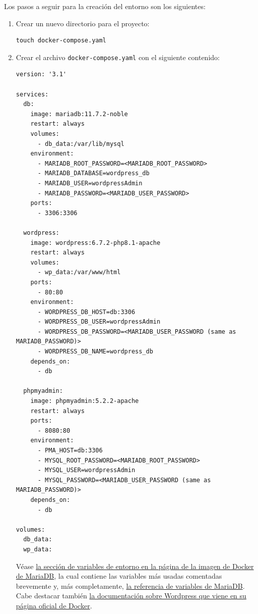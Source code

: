 \documentclass[a4paper]{article}
\begin{document}
\vspace{1em}

Los pasos a seguir para la creación del entorno son los siguientes:

\begin{enumerate}
    \item Crear un nuevo directorio para el proyecto:
    \begin{lstlisting}
touch docker-compose.yaml
    \end{lstlisting}

    \newpage

    \item Crear el archivo \texttt{docker-compose.yaml} con el siguiente contenido:
    \begin{lstlisting}
version: '3.1'

services:
  db:
    image: mariadb:11.7.2-noble
    restart: always
    volumes:
      - db_data:/var/lib/mysql
    environment:
      - MARIADB_ROOT_PASSWORD=<MARIADB_ROOT_PASSWORD>
      - MARIADB_DATABASE=wordpress_db
      - MARIADB_USER=wordpressAdmin
      - MARIADB_PASSWORD=<MARIADB_USER_PASSWORD>
    ports:
      - 3306:3306

  wordpress:
    image: wordpress:6.7.2-php8.1-apache
    restart: always
    volumes:
      - wp_data:/var/www/html
    ports:
      - 80:80
    environment:
      - WORDPRESS_DB_HOST=db:3306
      - WORDPRESS_DB_USER=wordpressAdmin
      - WORDPRESS_DB_PASSWORD=<MARIADB_USER_PASSWORD (same as MARIADB_PASSWORD)>
      - WORDPRESS_DB_NAME=wordpress_db
    depends_on:
      - db

  phpmyadmin:
    image: phpmyadmin:5.2.2-apache
    restart: always
    ports:
      - 8080:80
    environment:
      - PMA_HOST=db:3306
      - MYSQL_ROOT_PASSWORD=<MARIADB_ROOT_PASSWORD>
      - MYSQL_USER=wordpressAdmin
      - MYSQL_PASSWORD=<MARIADB_USER_PASSWORD (same as MARIADB_PASSWORD)>
    depends_on:
      - db

volumes:
  db_data:
  wp_data:
    \end{lstlisting}
    Véase \href{https://hub.docker.com/_/mariadb}{la sección de variables de entorno en la página de la imagen de Docker de MariaDB}, la cual contiene las variables más usadas comentadas brevemente y, más completamente, \href{https://mariadb.com/kb/en/mariadb-server-docker-official-image-environment-variables/}{la referencia de variables de MariaDB}. Cabe destacar también \href{https://hub.docker.com/_/wordpress}{la documentación sobre Wordpress que viene en su página oficial de Docker}.


\end{enumerate}
\end{document}

